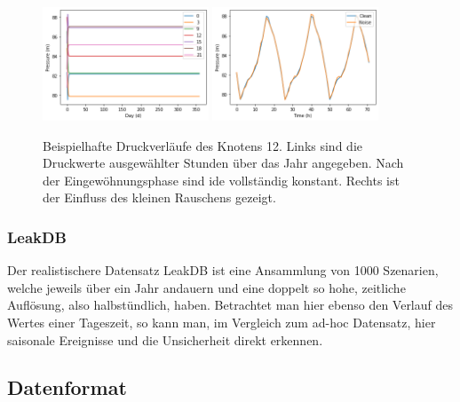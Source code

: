 \begin{figure}[ht]
    \centering
    \includegraphics[width=0.44\textwidth]{res/practice-noise-days.png}
    \includegraphics[width=0.44\textwidth]{res/practice-noise-applied.png}
    \caption{Beispielhafte Druckverläufe des Knotens 12. Links sind die Druckwerte ausgewählter Stunden über das
        Jahr angegeben. Nach der Eingewöhnungsphase sind ide vollständig konstant. Rechts ist der Einfluss des
        kleinen Rauschens gezeigt.}
    \label{fig:practice-noise}
\end{figure}

\subsubsection*{LeakDB}

Der realistischere Datensatz LeakDB \cite{vrachimis2018leakdb} ist eine Ansammlung von 1000 Szenarien, welche
 jeweils über ein Jahr andauern und eine doppelt so hohe, zeitliche Auflösung, also halbstündlich, haben.
 Betrachtet man hier ebenso den Verlauf des Wertes einer Tageszeit, so kann man, im Vergleich zum ad-hoc
 Datensatz, hier saisonale Ereignisse und die Unsicherheit direkt erkennen.

\subsection*{Datenformat}

